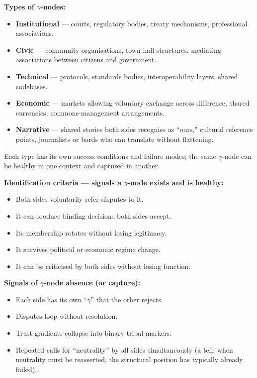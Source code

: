 \documentclass[
]{article}
\providecommand{\tightlist}{%
  \setlength{\itemsep}{0pt}\setlength{\parskip}{0pt}}
\begin{document}
\textbf{Types of \(\gamma\)-nodes:}

\begin{itemize}
\tightlist
\item
  \textbf{Institutional} --- courts, regulatory bodies, treaty
  mechanisms, professional associations.
\item
  \textbf{Civic} --- community organisations, town hall structures,
  mediating associations between citizens and government.
\item
  \textbf{Technical} --- protocols, standards bodies, interoperability
  layers, shared codebases.
\item
  \textbf{Economic} --- markets allowing voluntary exchange across
  difference, shared currencies, commons-management arrangements.
\item
  \textbf{Narrative} --- shared stories both sides recognise as
  ``ours,'' cultural reference points, journalists or bards who can
  translate without flattening.
\end{itemize}

Each type has its own success conditions and failure modes; the same
\(\gamma\)-node can be healthy in one context and captured in another.

\textbf{Identification criteria --- signals a \(\gamma\)-node exists
and is healthy:}

\begin{itemize}
\tightlist
\item
  Both sides voluntarily refer disputes to it.
\item
  It can produce binding decisions both sides accept.
\item
  Its membership rotates without losing legitimacy.
\item
  It survives political or economic regime change.
\item
  It can be criticised by both sides without losing function.
\end{itemize}

\textbf{Signals of \(\gamma\)-node absence (or capture):}

\begin{itemize}
\tightlist
\item
  Each side has its own ``\(\gamma\)'' that the other rejects.
\item
  Disputes loop without resolution.
\item
  Trust gradients collapse into binary tribal markers.
\item
  Repeated calls for ``neutrality'' by all sides simultaneously
  (a tell: when neutrality must be reasserted, the structural
  position has typically already failed).
\end{itemize}
\end{document}
